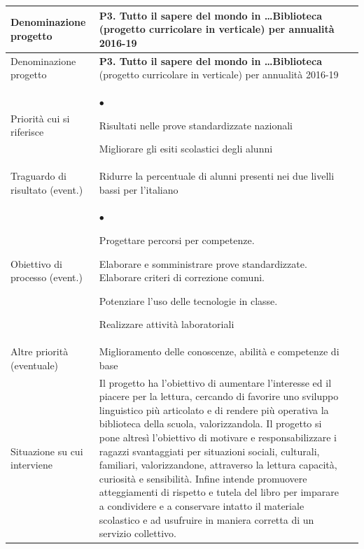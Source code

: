 \documentclass[12pt,a4paper,oneside]{memoir}
\newenvironment{elenco}{\begin{list}{$\bullet$}{%
              \setlength{\leftmargin}{4mm}%
              \setlength{\rightmargin}{1mm}%
               \setlength{\itemindent}{0mm}%
               \setlength{\labelwidth}{2mm}%
               \setlength{\labelsep}{2mm}%
              \setlength{\itemsep}{-\parsep}%
              \setlength{\partopsep}{0pt}%
              \setlength{\topsep}{0pt}%
             \setlength{\parskip}{0pt}%
              }}{\end{list}}
\begin{document}
\begin{footnotesize}
\begin{longtable}{|>{\raggedright}p{2.5cm}|>{\raggedright\arraybackslash}P{10cm}|}
\hline
{}
\label{P3}Denominazione progetto&\textbf{P3. Tutto il sapere del mondo in \ldots Biblioteca} (progetto curricolare in verticale) per annualità 2016-19\\ \hline \endfirsthead
\hline
{}
Denominazione progetto&\textbf{P3. Tutto il sapere del mondo in \ldots Biblioteca} (progetto curricolare in verticale) per annualità 2016-19\\ \hline \endhead
{}
\endfoot
\hline
\endlastfoot
Priorità cui si riferisce&\begin{elenco}
\item Risultati nelle prove standardizzate nazionali
\item Migliorare gli esiti scolastici degli alunni
\end{elenco}\\[-4mm] \hline
Traguardo di risultato (event.)&Ridurre la percentuale di alunni presenti nei due livelli bassi per l'italiano\\ \hline
Obiettivo di processo (event.)&
\begin{elenco}
\item Progettare percorsi per competenze.
\item Elaborare e somministrare prove standardizzate. Elaborare criteri di correzione comuni.
\item Potenziare l'uso delle tecnologie in classe.
\item Realizzare attività laboratoriali
\end{elenco}\\[-4mm] \hline
Altre priorità (eventuale)&Miglioramento delle conoscenze, abilità e competenze di base \\ \hline
Situazione su cui interviene&Il progetto ha l'obiettivo di aumentare l'interesse ed il piacere per la lettura, cercando di favorire uno sviluppo linguistico più articolato e di rendere più operativa la biblioteca della scuola, valorizzandola. Il progetto si pone altresì l'obiettivo di motivare e responsabilizzare i ragazzi svantaggiati per situazioni sociali, culturali, familiari, valorizzandone, attraverso la lettura capacità, curiosità e sensibilità. Infine intende promuovere atteggiamenti di rispetto e tutela del libro per imparare a condividere e a conservare intatto il materiale scolastico e ad usufruire in maniera corretta di un servizio collettivo. \\ \hline

\end{longtable}
\end{footnotesize}
\end{document}
